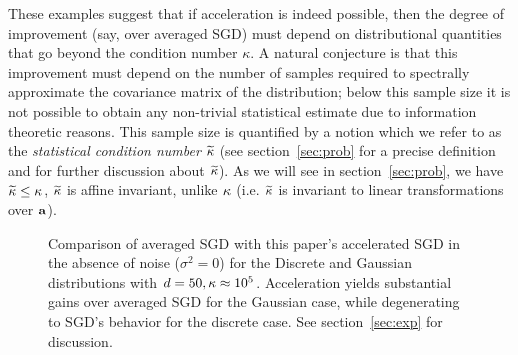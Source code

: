 These examples suggest that if acceleration is indeed possible, then the degree of 
improvement (say, over averaged SGD) must depend on distributional 
quantities that go beyond the condition number $\kappa$.
A natural conjecture is that this improvement must depend on 
the number of samples required to spectrally approximate 
the covariance matrix of the distribution; below this sample size it is 
not possible to obtain any non-trivial statistical estimate due 
to information theoretic reasons. This sample size is quantified by a
notion which we refer to as the {\em statistical condition number} $\widetilde{\kappa}$ (see
section~\ref{sec:prob} for a precise definition and for further
discussion about $\widetilde{\kappa}$). As we will see in section~\ref{sec:prob}, we have $\widetilde{\kappa}\leq{\kappa}$, $\widetilde{\kappa}$ is affine invariant, unlike ${\kappa}$ (i.e. $\widetilde{\kappa}$ is invariant to linear transformations over $\mathbf{a}$).\vspace*{-1mm}
\begin{figure}[t]
\centering
	\vspace*{-2mm}
\caption{Comparison of averaged SGD with this paper's accelerated SGD
  in the absence of noise ($\sigma^2=0$) for the Discrete and Gaussian
  distributions with $d=50,{\kappa}\approx 10^5$. Acceleration yields
  substantial gains over averaged SGD for the Gaussian case, while
  degenerating to SGD's behavior for the discrete case.
  See section~\ref{sec:exp} for discussion.}\vspace*{-0.8cm}
\label{fig:bias}
\end{figure}

